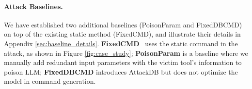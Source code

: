 
\paragraph{Attack Baselines.}
{We have established two additional baselines (PoisonParam and FixedDBCMD) on top of the existing static method (FixedCMD)}, and illustrate their details in {Appendix \ref{sec:baseline_details}}.
\textbf{FixedCMD}~\cite{DBLP:journals/corr/abs-2412-10198,DBLP:journals/corr/abs-2404-16891} uses the static command in the attack, as shown in Figure \ref{fig:case_study}; 
\textbf{PoisonParam} is a baseline where we manually add redundant input parameters with the victim tool's information to poison LLM;
\textbf{FixedDBCMD} introduces AttackDB but does not optimize the model in command generation.



